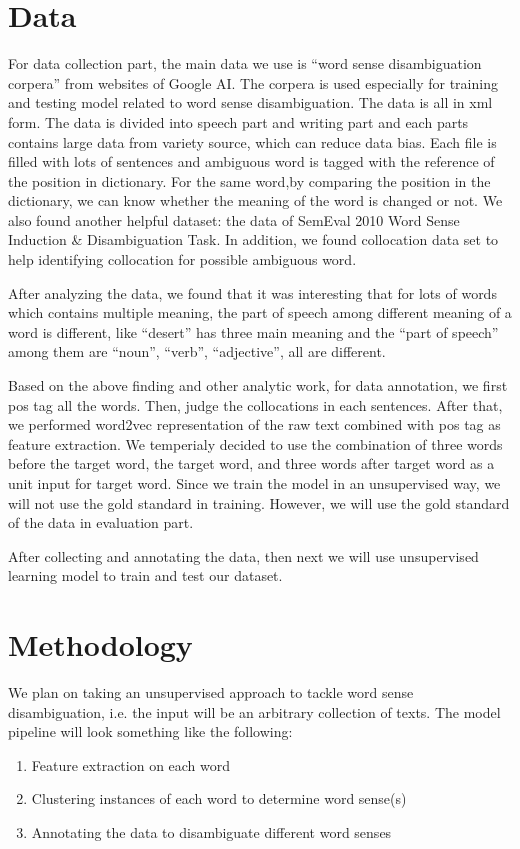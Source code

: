 \documentclass[11pt,letterpaper]{article}
\begin{document}
\section{Data}
For data collection part, the main data we use is ``word sense disambiguation corpera'' from websites of Google AI. The corpera is used especially for training and testing model related to word sense disambiguation. The data is all in xml form. The data is divided into speech part and writing part and each parts contains large data from variety source, which can reduce data bias. Each file is filled with lots of sentences and ambiguous word is tagged with the reference of the position in dictionary. For the same word,by comparing the position in the dictionary, we can know whether the meaning of the word is changed or not.  We also found another helpful dataset: the data of SemEval 2010 Word Sense Induction \& Disambiguation Task. In addition, we found collocation data set to help identifying collocation for possible ambiguous word.

After analyzing the data, we found that it was interesting that for lots of  words which contains multiple meaning, the part of speech among different meaning of a word is different, like ``desert'' has three main meaning and the ``part of speech'' among them are ``noun'', ``verb'', ``adjective'', all are different.

Based on the above finding and other analytic work, for data annotation, we first pos tag all the words. Then,  judge the collocations in each sentences. After that, we performed  word2vec representation of the raw text combined with pos tag as feature extraction. We temperialy decided to use the combination of three words before the target word, the target word, and three words after target word as a unit input for target word. Since we train the model in an unsupervised way, we will not use the gold standard in training. However, we will use the gold standard of the data in evaluation part.

After collecting and annotating the data, then next we will use unsupervised learning model to train and test our dataset.
\section{Methodology}
We plan on taking an unsupervised approach to tackle word sense disambiguation, i.e. the input will be an arbitrary collection of texts. The model pipeline will look something like the following:
\begin{enumerate}
  \item Feature extraction on each word
  \item Clustering instances of each word to determine word sense(s)
  \item Annotating the data to disambiguate different word senses
\end{enumerate}
\end{document}
